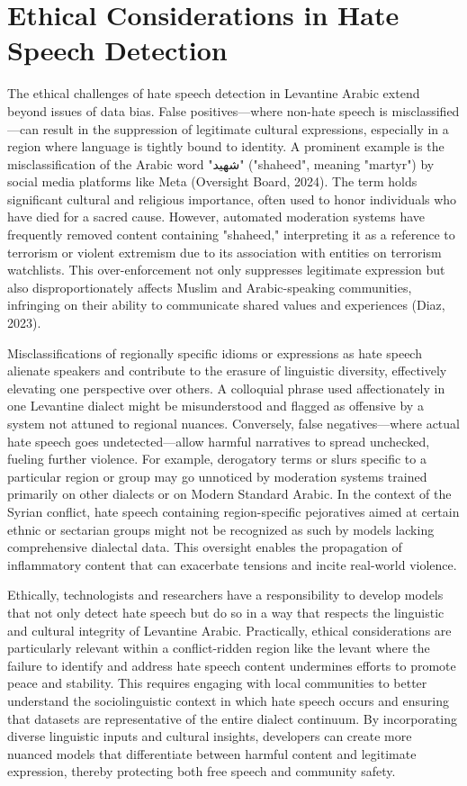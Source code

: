 \documentclass[11pt]{article}
\begin{document}
\section{Ethical Considerations in Hate Speech Detection}

The ethical challenges of hate speech detection in Levantine Arabic extend beyond issues of data bias. False positives—where non-hate speech is misclassified—can result in the suppression of legitimate cultural expressions, especially in a region where language is tightly bound to identity. A prominent example is the misclassification of the Arabic word "شهيد" ("shaheed", meaning "martyr") by social media platforms like Meta (Oversight Board, 2024). The term holds significant cultural and religious importance, often used to honor individuals who have died for a sacred cause. However, automated moderation systems have frequently removed content containing "shaheed," interpreting it as a reference to terrorism or violent extremism due to its association with entities on terrorism watchlists. This over-enforcement not only suppresses legitimate expression but also disproportionately affects Muslim and Arabic-speaking communities, infringing on their ability to communicate shared values and experiences (Diaz, 2023).

Misclassifications of regionally specific idioms or expressions as hate speech alienate speakers and contribute to the erasure of linguistic diversity, effectively elevating one perspective over others. A colloquial phrase used affectionately in one Levantine dialect might be misunderstood and flagged as offensive by a system not attuned to regional nuances. Conversely, false negatives—where actual hate speech goes undetected—allow harmful narratives to spread unchecked, fueling further violence. For example, derogatory terms or slurs specific to a particular region or group may go unnoticed by moderation systems trained primarily on other dialects or on Modern Standard Arabic. In the context of the Syrian conflict, hate speech containing region-specific pejoratives aimed at certain ethnic or sectarian groups might not be recognized as such by models lacking comprehensive dialectal data. This oversight enables the propagation of inflammatory content that can exacerbate tensions and incite real-world violence.

Ethically, technologists and researchers have a responsibility to develop models that not only detect hate speech but do so in a way that respects the linguistic and cultural integrity of Levantine Arabic. Practically, ethical considerations are particularly relevant within a conflict-ridden region like the levant where the failure to identify and address hate speech content undermines efforts to promote peace and stability. This requires engaging with local communities to better understand the sociolinguistic context in which hate speech occurs and ensuring that datasets are representative of the entire dialect continuum. By incorporating diverse linguistic inputs and cultural insights, developers can create more nuanced models that differentiate between harmful content and legitimate expression, thereby protecting both free speech and community safety.
\end{document}
